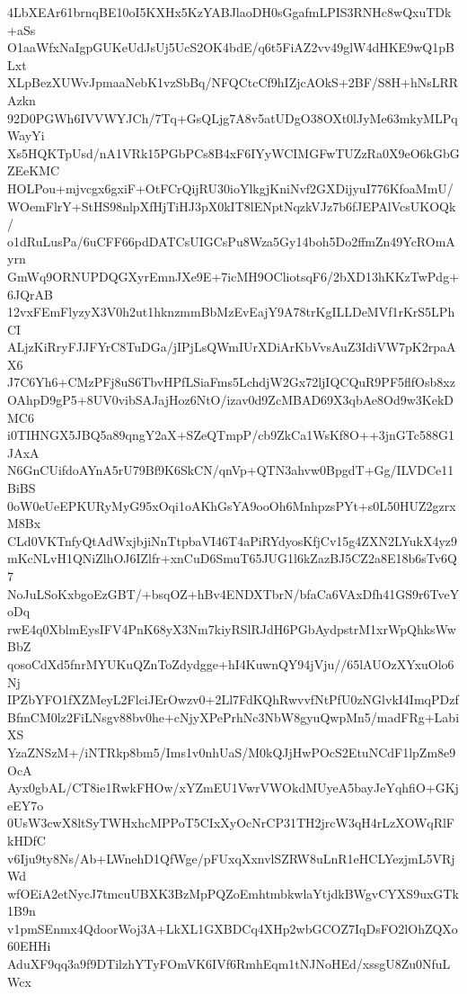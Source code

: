 4LbXEAr61brnqBE10oI5KXHx5KzYABJlaoDH0sGgafmLPIS3RNHc8wQxuTDk+aSs
O1aaWfxNaIgpGUKeUdJsUj5UcS2OK4bdE/q6t5FiAZ2vv49glW4dHKE9wQ1pBLxt
XLpBezXUWvJpmaaNebK1vzSbBq/NFQCtcCf9hIZjcAOkS+2BF/S8H+hNsLRRAzkn
92D0PGWh6IVVWYJCh/7Tq+GsQLjg7A8v5atUDgO38OXt0lJyMe63mkyMLPqWayYi
Xs5HQKTpUsd/nA1VRk15PGbPCs8B4xF6IYyWCIMGFwTUZzRa0X9eO6kGbGZEeKMC
HOLPou+mjvcgx6gxiF+OtFCrQijRU30ioYlkgjKniNvf2GXDijyuI776KfoaMmU/
WOemFlrY+StHS98nlpXfHjTiHJ3pX0kIT8lENptNqzkVJz7b6fJEPAlVcsUKOQk/
o1dRuLusPa/6uCFF66pdDATCsUIGCsPu8Wza5Gy14boh5Do2ffmZn49YcROmAyrn
GmWq9ORNUPDQGXyrEmnJXe9E+7icMH9OCliotsqF6/2bXD13hKKzTwPdg+6JQrAB
12vxFEmFlyzyX3V0h2ut1hknzmmBbMzEvEajY9A78trKgILLDeMVf1rKrS5LPhCI
ALjzKiRryFJJFYrC8TuDGa/jIPjLsQWmIUrXDiArKbVvsAuZ3IdiVW7pK2rpaAX6
J7C6Yh6+CMzPFj8uS6TbvHPfLSiaFms5LchdjW2Gx72ljIQCQuR9PF5flfOsb8xz
OAhpD9gP5+8UV0vibSAJajHoz6NtO/izav0d9ZcMBAD69X3qbAe8Od9w3KekDMC6
i0TIHNGX5JBQ5a89qngY2aX+SZeQTmpP/cb9ZkCa1WsKf8O++3jnGTc588G1JAxA
N6GnCUifdoAYnA5rU79Bf9K6SkCN/qnVp+QTN3ahvw0BpgdT+Gg/ILVDCe11BiBS
0oW0eUeEPKURyMyG95xOqi1oAKhGsYA9ooOh6MnhpzsPYt+s0L50HUZ2gzrxM8Bx
CLd0VKTnfyQtAdWxjbjiNnTtpbaVI46T4aPiRYdyosKfjCv15g4ZXN2LYukX4yz9
mKcNLvH1QNiZlhOJ6IZlfr+xnCuD6SmuT65JUG1l6kZazBJ5CZ2a8E18b6sTv6Q7
NoJuLSoKxbgoEzGBT/+bsqOZ+hBv4ENDXTbrN/bfaCa6VAxDfh41GS9r6TveYoDq
rwE4q0XblmEysIFV4PnK68yX3Nm7kiyRSlRJdH6PGbAydpstrM1xrWpQhksWwBbZ
qosoCdXd5fnrMYUKuQZnToZdydgge+hI4KuwnQY94jVju//65lAUOzXYxuOlo6Nj
IPZbYFO1fXZMeyL2FlciJErOwzv0+2Ll7FdKQhRwvvfNtPfU0zNGlvkI4ImqPDzf
BfmCM0lz2FiLNsgv88bv0he+cNjyXPePrhNc3NbW8gyuQwpMn5/madFRg+LabiXS
YzaZNSzM+/iNTRkp8bm5/Ims1v0nhUaS/M0kQJjHwPOcS2EtuNCdF1lpZm8e9OcA
Ayx0gbAL/CT8ie1RwkFHOw/xYZmEU1VwrVWOkdMUyeA5bayJeYqhfiO+GKjeEY7o
0UsW3cwX8ltSyTWHxhcMPPoT5CIxXyOcNrCP31TH2jrcW3qH4rLzXOWqRlFkHDfC
v6Iju9ty8Ns/Ab+LWnehD1QfWge/pFUxqXxnvlSZRW8uLnR1eHCLYezjmL5VRjWd
wfOEiA2etNycJ7tmcuUBXK3BzMpPQZoEmhtmbkwlaYtjdkBWgvCYXS9uxGTk1B9n
v1pmSEnmx4QdoorWoj3A+LkXL1GXBDCq4XHp2wbGCOZ7IqDsFO2lOhZQXo60EHHi
AduXF9qq3a9f9DTilzhYTyFOmVK6IVf6RmhEqm1tNJNoHEd/xssgU8Zu0NfuLWcx

